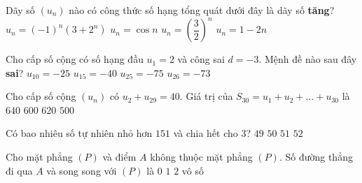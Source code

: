\begin{ex}%
Dãy số $(u_n)$ nào có công thức số hạng tổng quát dưới đây là dãy số \textbf{tăng}?
\choice 
{$u_n=\left(-1\right)^n\left(3+2^n\right)$}
{$u_n=\cos{n}$}
{\True $u_n=\left(\dfrac{3}{2}\right)^n$}
{$u_n=1-2n$}
\end{ex}
\begin{ex}%
Cho cấp số cộng có số hạng đầu $u_1=2$ và công sai $d=-3$. Mệnh đề nào sau đây \textbf{sai}?
\choice 
{$u_{10}=-25$}
{$u_{15}=-40$}
{\True $u_{25}=-75$}
{$u_{26}=-73$}
\end{ex}
\begin{ex}%
Cho cấp số cộng $(u_n)$ có $u_2+u_{29}=40$. Giá trị của $S_{30}=u_1+u_2+\ldots +u_{30}$ là
\choice 
{$640$}
{\True $600$}
{$620$}
{$500$}
\end{ex}
\begin{ex}%
Có bao nhiêu số tự nhiên nhỏ hơn $151$ và chia hết cho $3$?
\choice 
{$49$}
{$50$}
{\True $51$}
{$52$}
\end{ex}
\begin{ex}%
Cho mặt phẳng $(P)$ và điểm $A$ không thuộc mặt phẳng $(P)$. Số đường thẳng đi qua $A$ và song song với $(P)$ là
\choice 
{$0$}
{$1$}
{$2$}
{\True vô số}
\end{ex}
